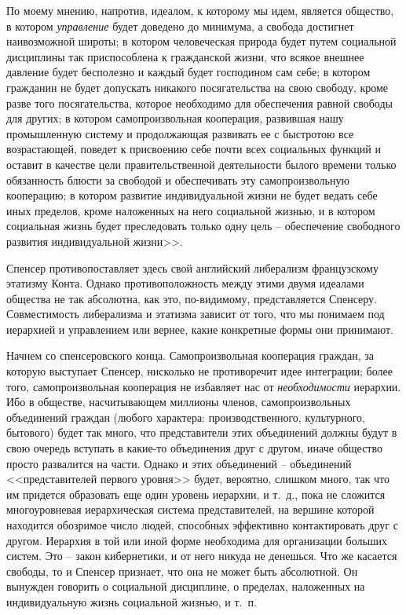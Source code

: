 \documentclass{book}
\begin{document}
По моему мнению, напротив, идеалом, к которому мы идем, является общество, в котором \textit{управление}  будет доведено до минимума, а свобода достигнет наивозможной широты; в ко­тором человеческая природа будет путем социальной дисцип­лины так приспособлена к гражданской жизни, что всякое внешнее давление будет бесполезно и каждый будет господи­ном сам себе; в котором гражданин не будет допускать ника­кого посягательства на свою свободу, кроме разве того пося­гательства, которое необходимо для обеспечения равной сво­боды для других; в котором самопроизвольная кооперация, развившая нашу промышленную систему и продолжающая раз­вивать ее с быстротою все возрастающей, поведет к присвоению себе почти всех социальных функций и оставит в качестве цели правительственной деятельности былого времени только обя­занность блюсти за свободой и обеспечивать эту самопроизволь­ную кооперацию; в котором развитие индивидуальной жизни не будет ведать себе иных пределов, кроме наложенных на не­го социальной жизнью, и в котором 
социальная жизнь будет преследовать только одну цель -- обеспечение свободного раз­вития индивидуальной жизни>>.

Спенсер противопоставляет здесь свой английский либера­лизм французскому этатизму Конта. Однако противополож­ность между этими двумя идеалами общества не так абсолютна, как это, по-видимому, представляется Спенсеру. Совместимость либерализма и этатизма зависит от того, что мы понимаем под иерархией и управлением или вернее, какие конкретные формы они принимают.

Начнем со спенсеровского конца. Самопроизвольная коопе­рация граждан, за которую выступает Спенсер, нисколько не противоречит идее интеграции; более того, самопроизвольная кооперация не избавляет нас от \textit{необходимости}  иерархии. Ибо в обществе, насчитывающем миллионы членов, самопроизволь­ных объединений граждан (любого характера: производствен­ного, культурного, бытового) будет так много, что предста­вители этих объединений должны будут в свою очередь всту­пать в какие-то объединения друг с другом, иначе общество просто развалится на части. Однако и этих объединений -- объе­динений <<представителей первого уровня>> будет, вероятно, слишком много, так что им придется образовать еще один уро­вень иерархии, и т.~д., пока не сложится многоуровневая иерар­хическая система представителей, на вершине которой находит­ся обозримое число людей, способных эффективно контакти­ровать друг с другом. Иерархия в той или иной форме необ­ходима для организации больших систем. Это -- закон кибер­нетики, и от него никуда не 
денешься. Что же касается свободы, то и Спенсер признает, что она не может быть абсолютной. Он вынужден говорить о социальной дисциплине, о пределах, наложенных на индивидуальную жизнь социальной жизнью, и т.~п.
\end{document}
